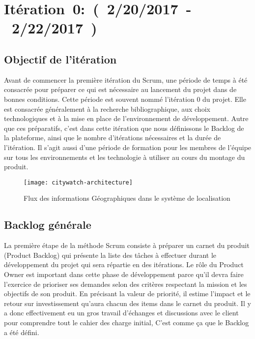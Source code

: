 \section{Itération~0:~(~2/20/2017~-~2/22/2017~)}

\subsection{Objectif de l'itération}

Avant de commencer la première itération du Scrum, une période de temps à été
consacrée pour préparer ce qui est nécessaire au lancement du projet dans de
bonnes conditions. Cette période est souvent nommé l'itération 0 du projet.
Elle est consacrée généralement à la recherche bibliographique, aux choix
technologiques et à la mise en place de l'environnement de développement. Autre
que ces préparatifs, c'est dans cette itération que nous définissons le Backlog
de la plateforme, ainsi que le nombre d'itérations nécessaires et la durée de
l'itération. Il s'agit aussi d'une période de formation pour les membres de
l'équipe sur tous les environnements et les technologie à utiliser au cours du
montage du produit.

\begin{figure}[htbp]
  \centering
  \texttt{[image: citywatch-architecture]}
  \caption[Flux des information Géographiques en CityWatch]
  {Flux des informations Géographiques dans le système de localisation}
  \label{fig:citywatch-architecture}
\end{figure}

\subsection{Backlog générale}

La première étape de la méthode Scrum consiste à préparer un carnet du produit
(Product Backlog) qui présente la liste des tâches à effectuer durant le
développement du projet qui sera répartie en des itérations. Le rôle du
Product Owner est important dans cette phase de développement parce qu'il devra
faire l'exercice de prioriser ses demandes selon des critères respectant la
mission et les objectifs de son produit. En précisant la valeur de priorité, il
estime l'impact et le retour sur investissement qu'aura chacun des items dans
le carnet du produit. Il y a donc effectivement eu un gros travail d'échanges
et discussions avec le client pour comprendre tout le cahier des charge
initial, C'est comme ça que le Backlog a été défini.

